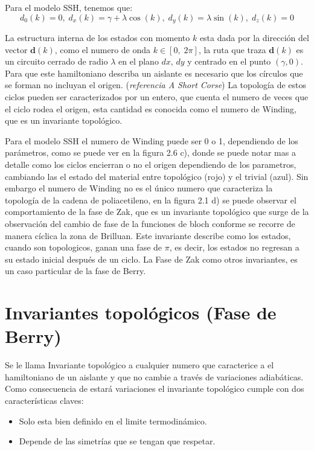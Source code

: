 Para el modelo SSH, tenemos que:
\begin{equation}
  d_0(k) = 0 ,\; d_x(k) = \gamma + \lambda \cos(k) , \; d_y(k) = \lambda \sin(k), \; d_z(k) = 0  
\end{equation}

La estructura interna de los estados con momento $k$ esta dada por la dirección del vector $\mathbf{d}(k)$, como el numero de onda $k  \in \left[ 0, \; 2\pi \right]$, la ruta que traza $\mathbf{d}(k)$ es un circuito cerrado de radio $\lambda$ en el plano $dx, \,dy$ y centrado en el punto $(\gamma, 0)$. Para que este hamiltoniano describa un aislante es necesario que los círculos que se forman no incluyan el origen. (\textit{referencia A Short Corse}) La topología de estos ciclos pueden ser caracterizados por un entero, que cuenta el numero de veces que el ciclo rodea el origen, esta cantidad es conocida como el numero de Winding, que es un invariante topológico.

Para el modelo SSH el numero de Winding puede ser 0 o 1, dependiendo de los parámetros, como se puede ver en la figura 2.6 c), donde se puede notar mas a detalle como los ciclos encierran o no el origen dependiendo de los parametros, cambiando las el estado del material entre topológico (rojo) y el trivial (azul). 
Sin embargo el numero de Winding no es el único numero que caracteriza la topología de la cadena de poliacetileno, en la figura 2.1 d) se puede observar el comportamiento de la fase de Zak, que es un invariante topológico que surge de la observación del cambio de fase de la funciones de bloch conforme se recorre de manera cíclica la zona de Brilluan. Este invariante describe como los estados, cuando son topologicos, ganan una fase de $\pi$, es decir, los estados no regresan a su estado inicial después de un ciclo. La Fase de Zak como otros invariantes, es un caso particular de la fase de Berry.

\section{Invariantes topológicos (Fase de Berry)}

Se le llama Invariante topológico a cualquier numero que caracterice a el hamiltoniano de un aislante y que no cambie a través de variaciones adiabáticas. Como consecuencia de estará variaciones el invariante topológico cumple con dos características claves:
\begin{itemize}
    \item Solo esta bien definido en el limite termodinámico.
    \item Depende de las simetrías que se tengan que respetar.
\end{itemize}

